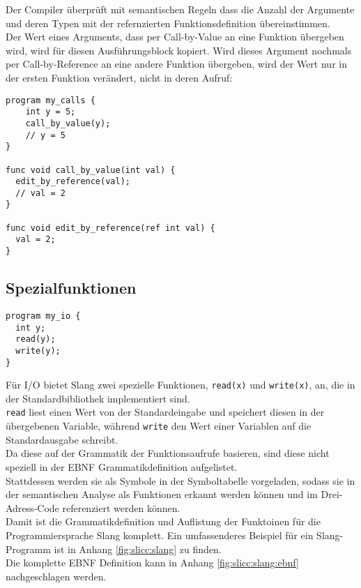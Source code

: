 Der Compiler überprüft mit semantischen Regeln dass die Anzahl der Argumente und deren Typen mit der refernzierten Funktionsdefinition übereinstimmen.\\
Der Wert eines Arguments, dass per Call-by-Value an eine Funktion übergeben wird, wird für diesen Ausführungsblock kopiert.
Wird dieses Argument nochmals per Call-by-Reference an eine andere Funktion übergeben, wird der Wert nur in der ersten Funktion verändert, nicht in deren Aufruf:\\

\begin{lstlisting}
program my_calls {
    int y = 5;
    call_by_value(y);
    // y = 5
}

func void call_by_value(int val) {
  edit_by_reference(val);
  // val = 2
}

func void edit_by_reference(ref int val) {
  val = 2;
}
\end{lstlisting}

\subsection{Spezialfunktionen}

\begin{lstlisting}
program my_io {
  int y;
  read(y);
  write(y);
}
\end{lstlisting}

Für I/O bietet Slang zwei spezielle Funktionen, \texttt{read(x)} und \texttt{write(x)}, an, die in der Standardbibliothek implementiert sind.\\
\texttt{read} liest einen Wert von der Standardeingabe und speichert diesen in der übergebenen Variable, während \texttt{write} den Wert einer Variablen auf die Standardausgabe schreibt.\\

Da diese auf der Grammatik der Funktionsaufrufe basieren, sind diese nicht speziell in der EBNF Grammatikdefinition aufgelistet.\\
Stattdessen werden sie als Symbole in der Symboltabelle vorgeladen, sodass sie in der semantischen Analyse als Funktionen erkannt werden können und im Drei-Adress-Code referenziert werden können.\\

Damit ist die Grammatikdefinition und Auflistung der Funktoinen für die Programmiersprache Slang komplett.
Ein umfassenderes Beispiel für ein Slang-Programm ist in Anhang \ref{fig:slicc:slang} zu finden. \\
Die komplette EBNF Definition kann in Anhang \ref{fig:slicc:slang:ebnf} nachgeschlagen werden. 

